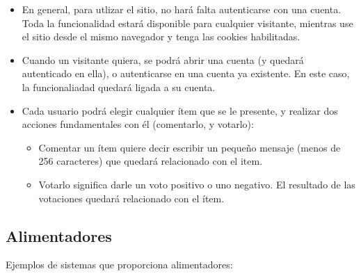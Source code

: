 \begin{itemize}
\item En general, para utlizar el sitio, no hará falta autenticarse con una cuenta. Toda la funcionalidad estará disponible para cualquier visitante, mientras use el sitio desde el mismo navegador y tenga las cookies habilitadas.

\item Cuando un visitante quiera, se podrá abrir una cuenta (y quedará autenticado en ella), o autenticarse en una cuenta ya existente. En este caso, la funcionaliadad quedará ligada a su cuenta.
  
\item Cada usuario podrá elegir cualquier ítem que se le presente, y realizar dos acciones fundamentales con él (comentarlo, y votarlo):
  \begin{itemize}
  \item Comentar un ítem quiere decir escribir un pequeño mensaje (menos de 256 caracteres) que quedará relacionado con el item.
  \item Votarlo significa darle un voto positivo o uno negativo. El resultado de las votaciones quedará relacionado con el ítem.
  \end{itemize}

\end{itemize}


\subsection{Alimentadores}
\label{practica-final-2020-05:alimentadores}

Ejemplos de sistemas que proporciona alimentadores:

